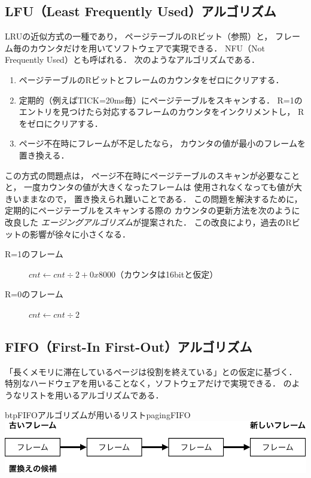 \subsection{LFU（Least Frequently Used）アルゴリズム}
LRUの近似方式の一種であり，
ページテーブルのRビット（参照）と，
フレーム毎のカウンタだけを用いてソフトウェアで実現できる．
NFU（Not Frequently Used）とも呼ばれる．
次のようなアルゴリズムである．

\begin{enumerate}
\item ページテーブルのRビットとフレームのカウンタをゼロにクリアする．
\item 定期的（例えばTICK=20ms毎）にページテーブルをスキャンする．
  R=1のエントリを見つけたら対応するフレームのカウンタをインクリメントし，
  Rをゼロにクリアする．
\item ページ不在時にフレームが不足したなら，
  カウンタの値が最小のフレームを置き換える．
\end{enumerate}

この方式の問題点は，
ページ不在時にページテーブルのスキャンが必要なことと，
一度カウンタの値が大きくなったフレームは
使用されなくなっても値が大きいままなので，
置き換えられ難いことである．
この問題を解決するために，
定期的にページテーブルをスキャンする際の
カウンタの更新方法を次のように改良した
\emph{エージングアルゴリズム}が提案された．
この改良により，過去のRビットの影響が徐々に小さくなる．

\begin{description}
\item[R=1のフレーム]
  $cnt \leftarrow cnt \div 2 + 0x8000$（カウンタは16bitと仮定）
\item[R=0のフレーム]
$cnt \leftarrow cnt \div 2$
\end{description}

\subsection{FIFO（First-In First-Out）アルゴリズム}
「長くメモリに滞在しているページは役割を終えている」との仮定に基づく．
特別なハードウェアを用いることなく，ソフトウェアだけで実現できる．
のようなリストを用いるアルゴリズムである．

\begin{myfig}{btp}{FIFOアルゴリズムが用いるリスト}{pagingFIFO}
  \includegraphics[scale=0.66]{Fig/pagingFIFO-crop.pdf}
\end{myfig}

